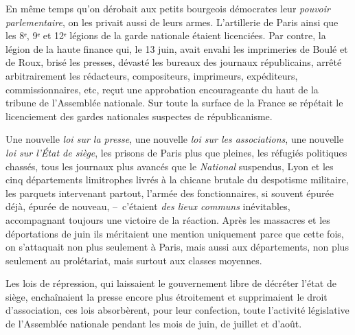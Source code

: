 \documentclass[twoside]{book} %
\begin{document}
En même temps qu’on dérobait aux petits bourgeois démocrates leur \emph{pouvoir parlementaire}, on les privait aussi de leurs armes. L’artillerie de Paris ainsi que les 8ᵉ, 9ᵉ et 12ᵉ légions de la garde nationale étaient licenciées. Par contre, la légion de la haute finance qui, le 13 juin, avait envahi les imprimeries de Boulé et de Roux, brisé les presses, dévasté les bureaux des journaux républicains, arrêté arbitrairement les rédacteurs, compositeurs, imprimeurs, expéditeurs, commissionnaires, etc, reçut une approbation encourageante du haut de la tribune de l’Assemblée nationale. Sur toute la surface de la France se répétait le licenciement des gardes nationales suspectes de républicanisme.\par
Une nouvelle \emph{loi sur la presse}, une nouvelle \emph{loi sur les associations}, une nouvelle \emph{loi sur l’État de siège}, les prisons de Paris plus que pleines, les réfugiés politiques chassés, tous les journaux plus avancés que le \emph{National} suspendus, Lyon et les cinq départements limitrophes livrés à la chicane brutale du despotisme militaire, les parquets intervenant partout, l’armée des fonctionnaires, si souvent épurée déjà, épurée de nouveau, – c’étaient \emph{des lieux communs} inévitables, accompagnant toujours une victoire de la réaction. Après les massacres et les déportations de juin ils méritaient une mention uniquement parce que cette fois, on s’attaquait non plus seulement à Paris, mais aussi aux départements, non plus seulement au prolétariat, mais surtout aux classes moyennes.\par
Les lois de répression, qui laissaient le gouvernement libre de décréter l’état de siège, enchaînaient la presse encore plus étroitement et supprimaient le droit d’association, ces lois absorbèrent, pour leur confection, toute l’activité législative de l’Assemblée nationale pendant les mois de juin, de juillet et d’août.\par
\end{document}
